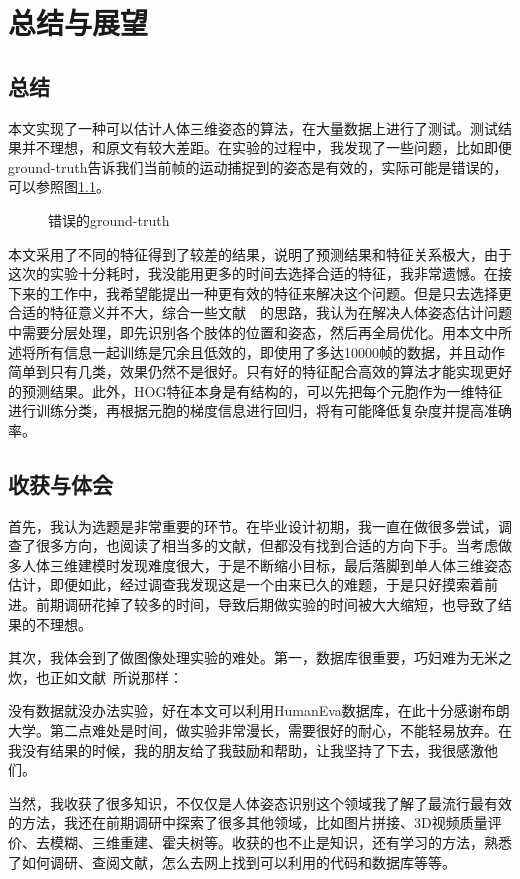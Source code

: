 

\chapter{总结与展望}
\section{总结}
本文实现了一种可以估计人体三维姿态的算法，在大量数据上进行了测试。测试结果并不理想，和原文有较大差距。在实验的过程中，我发现了一些问题，比如即便ground-truth告诉我们当前帧的运动捕捉到的姿态是有效的，实际可能是错误的，可以参照图\ref{fig:wrong}。
\begin{figure}[H]
  \centering
  \caption{错误的ground-truth}\label{fig:wrong}
\end{figure}

本文采用了不同的特征得到了较差的结果，说明了预测结果和特征关系极大，由于这次的实验十分耗时，我没能用更多的时间去选择合适的特征，我非常遗憾。在接下来的工作中，我希望能提出一种更有效的特征来解决这个问题。但是只去选择更合适的特征意义并不大，综合一些文献~\cite{ramanan2007learning}~\cite{yang2011articulated}的思路，我认为在解决人体姿态估计问题中需要分层处理，即先识别各个肢体的位置和姿态，然后再全局优化。用本文中所述将所有信息一起训练是冗余且低效的，即使用了多达10000帧的数据，并且动作简单到只有几类，效果仍然不是很好。只有好的特征配合高效的算法才能实现更好的预测结果。此外，HOG特征本身是有结构的，可以先把每个元胞作为一维特征进行训练分类，再根据元胞的梯度信息进行回归，将有可能降低复杂度并提高准确率。

\section{收获与体会}
首先，我认为选题是非常重要的环节。在毕业设计初期，我一直在做很多尝试，调查了很多方向，也阅读了相当多的文献，但都没有找到合适的方向下手。当考虑做多人体三维建模时发现难度很大，于是不断缩小目标，最后落脚到单人体三维姿态估计，即便如此，经过调查我发现这是一个由来已久的难题，于是只好摸索着前进。前期调研花掉了较多的时间，导致后期做实验的时间被大大缩短，也导致了结果的不理想。

其次，我体会到了做图像处理实验的难处。第一，数据库很重要，巧妇难为无米之炊，也正如文献~\cite{gkiox2013ariarticulated}所说那样：\\
\begin{center}
\end{center}
没有数据就没办法实验，好在本文可以利用HumanEva数据库，在此十分感谢布朗大学。第二点难处是时间，做实验非常漫长，需要很好的耐心，不能轻易放弃。在我没有结果的时候，我的朋友给了我鼓励和帮助，让我坚持了下去，我很感激他们。

当然，我收获了很多知识，不仅仅是人体姿态识别这个领域我了解了最流行最有效的方法，我还在前期调研中探索了很多其他领域，比如图片拼接、3D视频质量评价、去模糊、三维重建、霍夫树等。收获的也不止是知识，还有学习的方法，熟悉了如何调研、查阅文献，怎么去网上找到可以利用的代码和数据库等等。